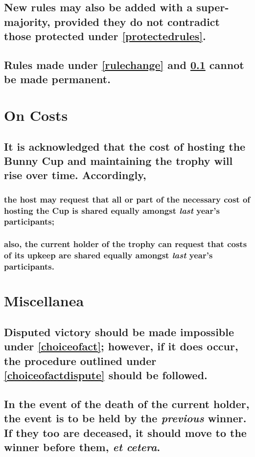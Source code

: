 \documentclass[a4paper]{article}
\begin{document}
\subsection{New rules may also be added with a super-majority, provided they do not contradict those protected under \ref{protectedrules}.}\label{newrule}
\subsection{Rules made under \ref{rulechange} and \ref{newrule} cannot be made permanent.}

\section{On Costs}\label{costs}
\subsection{It is acknowledged that the cost of hosting the Bunny Cup and maintaining the trophy will rise over time.  Accordingly, }
\subsubsection{the host may request that all or part of the necessary cost of hosting the Cup is shared equally amongst \emph{last} year's participants;}
\subsubsection{also, the current holder of the trophy can request that costs of its upkeep are shared equally amongst \emph{last} year's participants.}

\newpage

\section{Miscellanea}
\subsection{Disputed victory should be made impossible under \ref{choiceofact}; however, if it does occur,  the procedure outlined under \ref{choiceofactdispute} should be followed.}
\subsection{In the event of the death of the current holder, the event is to be held by the \emph{previous} winner. If they too are deceased, it should move to the winner before them, \emph{et cetera}.}
\end{document}
